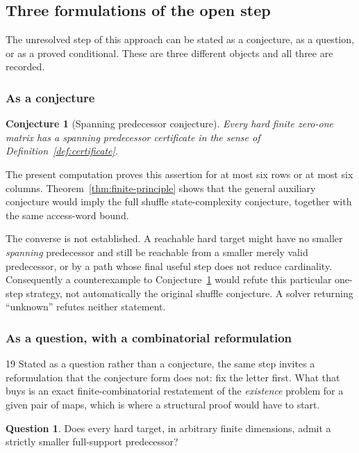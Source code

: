\documentclass[11pt,letterpaper]{article}
\numberwithin{equation}{section}
\newtheorem{conjecture}[theorem]{Conjecture}
\theoremstyle{definition}
\newtheorem{question}[theorem]{Question}
\theoremstyle{remark}
\begin{document}
\subsection{Three formulations of the open step}
\label{sec:open-formulations}
The unresolved step of this approach can be stated as a conjecture, as a
question, or as a proved conditional. These are three different objects and
all three are recorded.

\subsubsection{As a conjecture}
\begin{conjecture}[Spanning predecessor conjecture]\label{conj:spanning}
Every hard finite zero-one matrix has a spanning predecessor certificate
in the sense of Definition~\ref{def:certificate}.
\end{conjecture}

The present computation proves this assertion for at most six rows or at
most six columns. Theorem~\ref{thm:finite-principle} shows that the general
auxiliary conjecture would imply the full shuffle state-complexity
conjecture, together with the same access-word bound.

The converse is not established. A reachable hard target might have no
smaller \emph{spanning} predecessor and still be reachable from a smaller
merely valid predecessor, or by a path whose final useful step does not
reduce cardinality. Consequently a counterexample to
Conjecture~\ref{conj:spanning} would refute this particular one-step
strategy, not automatically the original shuffle conjecture. A solver
returning ``unknown'' refutes neither statement.

\subsubsection{As a question, with a combinatorial reformulation}
\begin{variantbox}{19}
Stated as a question rather than a conjecture, the same step invites a
reformulation that the conjecture form does not: fix the letter first. What
that buys is an exact finite-combinatorial restatement of the
\emph{existence} problem for a given pair of maps, which is where a
structural proof would have to start.
\end{variantbox}

\begin{question}\label{q:spanning}
Does every hard target, in arbitrary finite dimensions, admit a strictly
smaller full-support predecessor?
\end{question}
\end{document}
